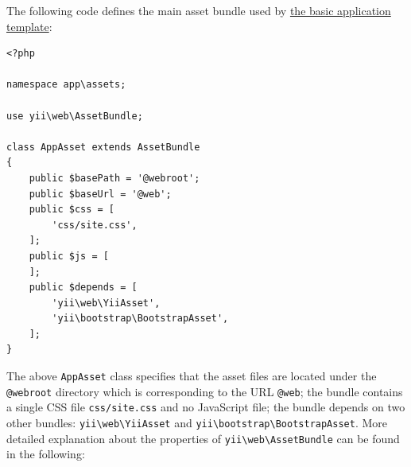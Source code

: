 The following code defines the main asset bundle used by \hyperref[start-installation.md]{the basic application template}:

\lstset{language=php}\begin{lstlisting}
<?php

namespace app\assets;

use yii\web\AssetBundle;

class AppAsset extends AssetBundle
{
    public $basePath = '@webroot';
    public $baseUrl = '@web';
    public $css = [
        'css/site.css',
    ];
    public $js = [
    ];
    public $depends = [
        'yii\web\YiiAsset',
        'yii\bootstrap\BootstrapAsset',
    ];
}
\end{lstlisting}
The above \lstinline|AppAsset| class specifies that the asset files are located under the \lstinline|@webroot| directory which
is corresponding to the URL \lstinline|@web|; the bundle contains a single CSS file \lstinline|css/site.css| and no JavaScript file;
the bundle depends on two other bundles: \texttt{yii{\allowbreak{}\textbackslash}web{\allowbreak{}\textbackslash}YiiAsset} and \texttt{yii{\allowbreak{}\textbackslash}bootstrap{\allowbreak{}\textbackslash}BootstrapAsset}. More detailed
explanation about the properties of \texttt{yii{\allowbreak{}\textbackslash}web{\allowbreak{}\textbackslash}AssetBundle} can be found in the following:

